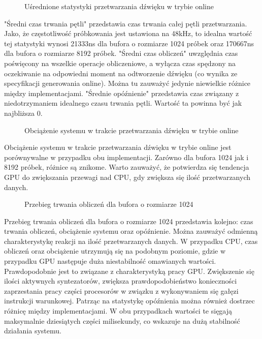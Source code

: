 \begin{figure}[H]
    \centering
    \scalebox{1.0}{}
    \caption{Uśrednione statystyki przetwarzania dźwięku w trybie online}
    \label{fig:Uśrednione statystyki przetwarzania dźwięku w trybie online}
\end{figure}

"Średni czas trwania pętli" przedstawia czas trwania całej pętli przetwarzania. Jako, że częstotliwość próbkowania jest ustawiona na 48kHz, to idealna wartość tej statystyki wynosi 21333ns dla bufora o rozmiarze 1024 próbek oraz 170667ns dla bufora o rozmiarze 8192 próbek. "Średni czas obliczeń" uwzględnia czas poświęcony na wszelkie operacje obliczeniowe, a wyłącza czas spędzony na oczekiwanie na odpowiedni moment na odtworzenie dźwięku (co wynika ze specyfikacji generowania online). Można tu zauważyć jedynie niewielkie różnice między implementacjami. "Średnie opóźnienie" przedstawia czas związany z niedotrzymaniem idealnego czasu trwania pętli. Wartość ta powinna być jak najbliższa 0.

\begin{figure}[H]
    \centering
    \scalebox{1.0}{}
    \caption{Obciążenie systemu w trakcie przetwarzania dźwięku w trybie online}
    \label{fig:Obciążenie systemu w trakcie przetwarzania dźwięku w trybie online}
\end{figure}

Obciążenie systemu w trakcie przetwarzania dźwięku w trybie online jest porównywalne w przypadku obu implementacji. Zarówno dla bufora 1024 jak i 8192 próbek, różnice są znikome. Warto zauważyć, że potwierdza się tendencja GPU do zwiększania przewagi nad CPU, gdy zwiększa się ilość przetwarzanych danych.

\begin{figure}[H]
    \centering
    \scalebox{1.0}{}
    \caption{Przebieg trwania obliczeń dla bufora o rozmiarze 1024}
    \label{fig:Przebieg trwania obliczeń dla bufora o rozmiarze 1024}
\end{figure}

Przebieg trwania obliczeń dla bufora o rozmiarze 1024 przedstawia kolejno: czas trwania obliczeń, obciążenie systemu oraz opóźnienie. Można zauważyć odmienną charakterystykę reakcji na ilość przetwarzanych danych. W przypadku CPU, czas obliczeń oraz obciążenie utrzymują się na podobnym poziomie, gdzie w przypadku GPU następuje duża niestabilność omawianych wartości. Prawdopodobnie jest to związane z charakterystyką pracy GPU. Zwiększenie się ilości aktywnych syntezatorów, zwiększa prawdopodobieństwo konieczności zaprzestania pracy części procesorów w związku z wykonywaniem się gałęzi instrukcji warunkowej. Patrząc na statystykę opóźnienia można również dostrzec różnicę między implementacjami. W obu przypadkach wartości te sięgają maksymalnie dziesiątych części milisekundy, co wskazuje na dużą stabilność działania systemu.